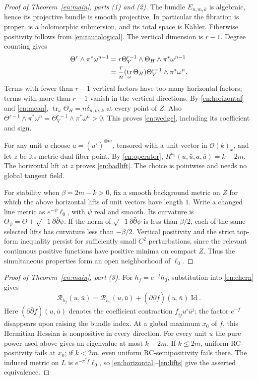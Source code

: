 \documentclass[12pt]{amsart}
\theoremstyle{definition}
\theoremstyle{remark}
\numberwithin{equation}{section}
\DeclareMathOperator{\tr}{tr}
\DeclareMathOperator{\Id}{Id}
\newcommand{\E}{E_{n,m,k}}
\newcommand{\cst}{\delta_{n,m,k}}
\newcommand{\ddc}{\sqrt{-1}\partial\bar\partial}
\newcommand{\eref}[1]{\eqref{en:#1}}
\begin{document}
\begin{proof}[Proof of Theorem~\ref{en:main}, parts (1) and (2)]
The bundle $\E$ is algebraic, hence its projective bundle is smooth projective. In particular the fibration is proper, is a holomorphic submersion, and its total space is Kähler. Fiberwise positivity follows from \eref{tautological}. The vertical dimension is $r-1$. Degree counting gives
\begin{align}
\Theta^r\wedge\pi^*\omega^{n-1}
&=r\Theta_V^{r-1}\wedge\Theta_H\wedge\pi^*\omega^{n-1}\notag\\
&=\frac rn(\tr_\omega\Theta_H)\Theta_V^{r-1}\wedge\pi^*\omega^n.
\label{en:degreecount}
\end{align}
Terms with fewer than $r-1$ vertical factors have too many horizontal factors; terms with more than $r-1$ vanish in the vertical directions. By \eref{horizontal} and \eref{mean}, $\tr_\omega\Theta_H=n\cst$ at every point of $Z$. Also
$\Theta^{r-1}\wedge\pi^*\omega^n=\Theta_V^{r-1}\wedge\pi^*\omega^n>0$.
This proves \eref{wedge}, including its coefficient and sign.

For any unit $u$ choose $a=(u^\flat)^{\otimes m}$, tensored with a unit vector in $\mathcal O(k)_x$, and let $z$ be its metric-dual fiber point. By \eref{operator}, $R^{h_0}(u,\bar u,a,\bar a)=k-2m$. The horizontal lift at $z$ proves \eref{badlift}. The choice is pointwise and needs no global tangent field.

For stability when $\beta=2m-k>0$, fix a smooth background metric on $Z$ for which the above horizontal lifts of unit vectors have length $1$. Write a changed line metric as $e^{-\psi}\ell_0$, with $\psi$ real and smooth. Its curvature is $\Theta_\psi=\Theta+\ddc\psi$. If the norm of $\ddc\psi$ is less than $\beta/2$, each of the same selected lifts has curvature less than $-\beta/2$. Vertical positivity and the strict top-form inequality persist for sufficiently small $C^2$ perturbations, since the relevant continuous positive functions have positive minima on compact $Z$. Thus the simultaneous properties form an open neighborhood of $\ell_0$.
\end{proof}

\begin{proof}[Proof of Theorem~\ref{en:main}, part (3)]
For $h_f=e^{-f}h_0$, substitution into \eref{chern} gives
\begin{equation}\label{en:conformal}
\mathcal R_{h_f}(u,\bar u)
=\mathcal R_{h_0}(u,\bar u)
+(\partial\bar\partial f)(u,\bar u)\Id.
\end{equation}
Here $(\partial\bar\partial f)(u,\bar u)$ denotes the coefficient contraction $f_{i\bar j}u^i\bar u^j$; the factor $e^{-f}$ disappears upon raising the bundle index. At a global maximum $x_0$ of $f$, this Hermitian Hessian is nonpositive in every direction. For every unit $u$ the pure power used above gives an eigenvalue at most $k-2m$. If $k\le2m$, uniform RC-positivity fails at $x_0$; if $k<2m$, even uniform RC-semipositivity fails there. The induced metric on $L$ is $e^{-\pi^*f}\ell_0$, so \eref{horizontal}--\eref{lifts} give the asserted equivalence.
\end{proof}
\end{document}
